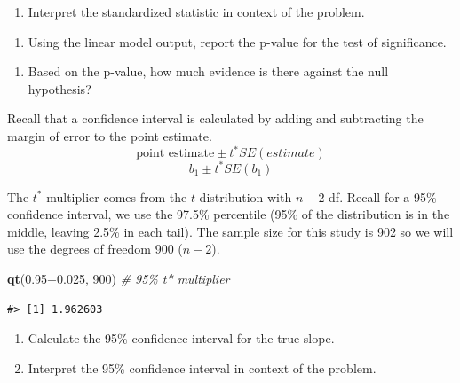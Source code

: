 \documentclass[
]{report}
\newenvironment{Shaded}{\begin{snugshade}}{\end{snugshade}}
\newcommand{\CommentTok}[1]{\textcolor[rgb]{0.56,0.35,0.01}{\textit{#1}}}
\newcommand{\DecValTok}[1]{\textcolor[rgb]{0.00,0.00,0.81}{#1}}
\newcommand{\FloatTok}[1]{\textcolor[rgb]{0.00,0.00,0.81}{#1}}
\newcommand{\KeywordTok}[1]{\textcolor[rgb]{0.13,0.29,0.53}{\textbf{#1}}}
\newcommand{\NormalTok}[1]{#1}
\providecommand{\tightlist}{%
  \setlength{\itemsep}{0pt}\setlength{\parskip}{0pt}}
\begin{document}
\vspace{1in}

\begin{enumerate}
\def\labelenumi{\arabic{enumi}.}
\setcounter{enumi}{12}
\tightlist
\item
  Interpret the standardized statistic in context of the problem.
\end{enumerate}

\vspace{0.8in}

\begin{enumerate}
\def\labelenumi{\arabic{enumi}.}
\setcounter{enumi}{13}
\tightlist
\item
  Using the linear model output, report the p-value for the test of significance.
\end{enumerate}

\vspace{0.5in}

\begin{enumerate}
\def\labelenumi{\arabic{enumi}.}
\setcounter{enumi}{14}
\tightlist
\item
  Based on the p-value, how much evidence is there against the null hypothesis?
\end{enumerate}

\vspace{0.5in}

Recall that a confidence interval is calculated by adding and subtracting the margin of error to the point estimate.\\
\[\mbox{point estimate}\pm t^*SE(estimate)\]
\[b_1 \pm t^* SE(b_1)\]

The \(t^*\) multiplier comes from the \(t\)-distribution with \(n-2\) df. Recall for a 95\% confidence interval, we use the 97.5\% percentile (95\% of the distribution is in the middle, leaving 2.5\% in each tail). The sample size for this study is 902 so we will use the degrees of freedom 900 (\(n-2\)).

\begin{Shaded}
\begin{Highlighting}[]
\KeywordTok{qt}\NormalTok{(}\FloatTok{0.95+0.025}\NormalTok{, }\DecValTok{900}\NormalTok{) }\CommentTok{\# 95\% t* multiplier }
\end{Highlighting}
\end{Shaded}

\begin{verbatim}
#> [1] 1.962603
\end{verbatim}

\begin{enumerate}
\def\labelenumi{\arabic{enumi}.}
\setcounter{enumi}{15}
\item
  Calculate the 95\% confidence interval for the true slope.
  \vspace{0.8in}
\item
  Interpret the 95\% confidence interval in context of the problem.
\end{enumerate}
\end{document}
